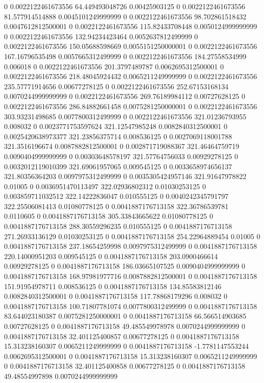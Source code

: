 0 0.0022122461673556 64.449493048726 0.00425903125
0 0.0022122461673556 81.577914514888 0.0045101249999999
0 0.0022122461673556 98.702861518432 0.0047612812500001
0 0.0022122461673556 115.82433708448 0.0050124999999999
0 0.0022122461673556 132.94234423464 0.0052637812499999
0 0.0022122461673556 150.05688598669 0.0055151250000001
0 0.0022122461673556 167.16796535498 0.0057665312499999
0 0.0022122461673556 184.27558534999 0.006018
0 0.0022122461673556 201.3797489787 0.0062695312500001
0 0.0022122461673556 218.48045924432 0.0065211249999999
0 0.0022122461673556 235.57771914656 0.00677278125
0 0.0022122461673556 252.67153168134 0.0070244999999999
0 0.0022122461673556 269.76189984112 0.00727628125
0 0.0022122461673556 286.84882661458 0.0075281250000001
0 0.0022122461673556 303.93231498685 0.0077800312499999
0 0.0022122461673556 321.01236793955 0.008032
0 0.0023771753597624 321.12547985248 0.0082840312500001
0 0.0025420638973377 321.23856375714 0.008536125
0 0.0027069118001788 321.3516196674 0.0087882812500001
0 0.002871719088367 321.46464759719 0.0090404999999999
0 0.00303648578197 321.57764756033 0.00929278125
0 0.0032012119010399 321.69061957065 0.009545125
0 0.0033658974656137 321.80356364203 0.0097975312499999
0 0.0035305424957146 321.91647978822 0.01005
0 0.0036951470113497 322.02936802312 0.01030253125
0 0.003859711032512 322.14222836047 0.010555125
0 0.0040242345791797 322.25506081413 0.01080778125
0 0.0041887176713158 322.36786539781 0.0110605
0 0.0041887176713158 305.33843665622 0.01080778125
0 0.0041887176713158 288.30559296235 0.010555125
0 0.0041887176713158 271.26933136129 0.01030253125
0 0.0041887176713158 254.22964889454 0.01005
0 0.0041887176713158 237.18654259998 0.0097975312499999
0 0.0041887176713158 220.14000951203 0.009545125
0 0.0041887176713158 203.0900466614 0.00929278125
0 0.0041887176713158 186.03665107525 0.0090404999999999
0 0.0041887176713158 168.97981977716 0.0087882812500001
0 0.0041887176713158 151.91954978711 0.008536125
0 0.0041887176713158 134.85583812146 0.0082840312500001
0 0.0041887176713158 117.78868179296 0.008032
0 0.0041887176713158 100.71807781074 0.0077800312499999
0 0.0041887176713158 83.644023180387 0.0075281250000001
0 0.0041887176713158 66.566514903685 0.00727628125
0 0.0041887176713158 49.485549978978 0.0070244999999999
0 0.0041887176713158 32.401125400857 0.00677278125
0 0.0041887176713158 15.313238160307 0.0065211249999999
0 0.0041887176713158 -1.7781147553244 0.0062695312500001
0 0.0041887176713158 15.313238160307 0.0065211249999999
0 0.0041887176713158 32.401125400858 0.00677278125
0 0.0041887176713158 49.48554997898 0.0070244999999999
